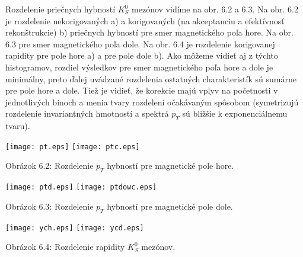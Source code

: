 Rozdelenie priečnych hybností $K^{0}_{S}$ mezónov vidíme na obr. 6.2 a 6.3.
Na  obr. 6.2  je rozdelenie nekorigovaných a) a korigovaných (na
akceptanciu a efektívnosť rekonštrukcie) b) priečnych hybností pre 
smer magnetického poľa hore. Na obr. 6.3 pre smer magnetického poľa dole.
Na obr. 6.4 je rozdelenie korigovanej rapidity pre pole hore a) a pre pole
dole b).  Ako môžeme vidieť aj z týchto histogramov, rozdiel výsledkov pre
smer magnetického poľa hore a dole je minimálny, preto  ďalej uvádzané
rozdelenia ostatných charakteristík sú sumárne  pre pole hore a
dole.  Tiež je vidieť, že korekcie majú  vplyv na početnosti v
jednotlivých binoch a menia tvary rozdelení očakávaným spôsobom (symetrizujú
rozdelenie invariantných hmotností a spektrá $p_{T}$ sú bližšie k
exponenciálnemu tvaru).


\newpage
\begin{center}
\texttt{[image: pt.eps]}
\texttt{[image: ptc.eps]}
\end{center}
\begin{center}
  Obrázok 6.2: Rozdelenie $p_{T}$ hybností pre magnetické pole hore.
\end{center}
\begin{center}
\texttt{[image: ptd.eps]}
\texttt{[image: ptdowc.eps]}
\end{center}
\begin{center}
  Obrázok 6.3: Rozdelenie $p_{T}$ hybností pre magnetické pole dole.
\end{center}

\begin{center}
  \texttt{[image: ych.eps]}
  \texttt{[image: ycd.eps]}

\end{center}
\begin{center}
  Obrázok 6.4: Rozdelenie rapidity $K^{0}_{S}$ mezónov.
\end{center}


